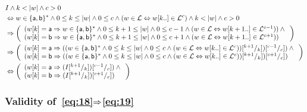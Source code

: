 \documentclass[a4paper]{scrartcl}
\newcommand{\ah}{\mathsf{a}}
\newcommand{\be}{\mathsf{b}}
\def\L{\mathcal{L}}
\begin{document}
\begin{align*}
  &I\And k < |w|\And c > 0\\
  & \Equiv
  w\in\{\ah,\be\}^* \And 0\leq k\leq|w| \And 0\leq c\And (w\in\L\Equiv w[k..]\in\L^c)  \And k < |w|\And c > 0\\
  & \Implies \left(
    \begin{array}[c]{l}
      (w[k]=\ah \Implies w\in\{\ah,\be\}^* \And 0\leq k+1\leq|w| \And 0\leq c-1\And (w\in\L\Equiv w[k+1..]\in\L^{c-1}))\And{}\\
      (w[k]=\be \Implies w\in\{\ah,\be\}^* \And 0\leq k+1\leq|w| \And 0\leq c+1\And (w\in\L\Equiv w[k+1..]\in\L^{c+1}))
    \end{array}
  \right)\\  
  & \Implies \left(
    \begin{array}[c]{l}
      (w[k]=\ah \Implies ((w\in\{\ah,\be\}^* \And 0\leq k\leq|w| \And 0\leq c\And (w\in\L\Equiv w[k..]\in\L^c))\subst{k+1}k)\subst{c-1}c)\And{}\\
      (w[k]=\be \Implies ((w\in\{\ah,\be\}^* \And 0\leq k\leq|w| \And 0\leq c\And (w\in\L\Equiv w[k..]\in\L^c))\subst{k+1}k)\subst{c+1}c)
    \end{array}
  \right)\\  
  & \Equiv \left(
    \begin{array}[c]{l}
      (w[k]=\ah \Implies (I\subst{k+1}k)\subst{c-1}c)\And{}\\
      (w[k]=\be \Implies (I\subst{k+1}k)\subst{c+1}c)
    \end{array}
  \right)\\  
\end{align*}

\subsubsection{Validity of~\eqref{eq:18}$\Rightarrow$\eqref{eq:19}}
\label{sec:valid-eqref-2}
\end{document}
